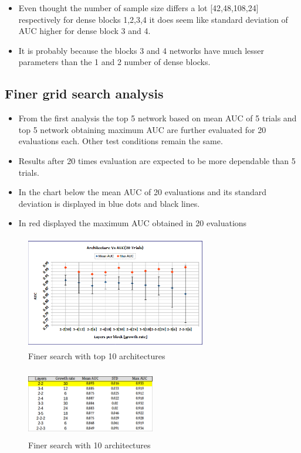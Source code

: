 \begin{itemize}
 \item Even thought the number of sample size differs a lot [42,48,108,24] respectively for dense blocks 1,2,3,4  it does seem like standard deviation of AUC higher for dense block 3 and 4.
 \item It is probably because the blocks 3 and 4 networks have much lesser parameters than the 1 and 2 number of dense blocks.
\end{itemize}

\subsection{Finer grid search analysis}
\begin{itemize}
 \item From the first analysis the top 5 network based on mean AUC of 5 trials and top 5 network obtaining maximum AUC are further evaluated for 20 evaluations each. Other test conditions remain the same. 
 \item Results after 20 times evaluation are expected to be more dependable than 5 trials.
 \item In the chart below the mean AUC of 20 evaluations and its standard deviation is displayed in blue dots and black lines. 
 \item In red displayed the maximum AUC obtained in 20 evaluations
\end{itemize}

\begin{figure}[ht]
\centering
\includegraphics[height=5cm,width=0.7\textwidth]{images/densenet/arch_vs_auc_finer}
\caption{Finer search with top 10 architectures}
\label{fig:arch_vs_auc_finer}
\end{figure}

\begin{figure}[ht]
\centering
\includegraphics[height=3cm,width=0.5\textwidth]{images/densenet/finer_structure_analysis}
\caption{Finer search with 10 architectures}
\label{fig:arch_vs_auc_finer_table}
\end{figure}


